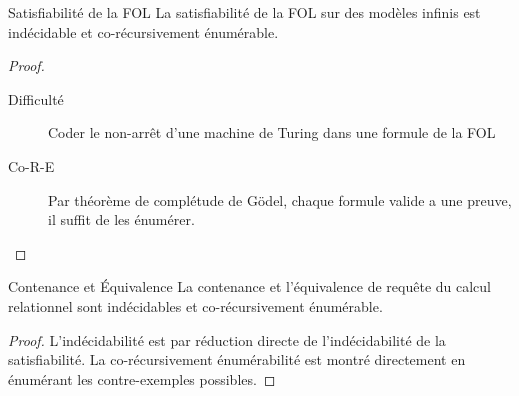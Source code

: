 \documentclass{cours}
\begin{document}
\begin{théorème}{Satisfiabilité de la FOL}{}
    La satisfiabilité de la FOL sur des modèles infinis est indécidable et co-récursivement énumérable. 
\end{théorème}
\begin{proof}
    \begin{description}
        \item[Difficulté] Coder le non-arrêt d'une machine de Turing dans une formule de la FOL
        \item[Co-R-E] Par théorème de complétude de Gödel, chaque formule valide a une preuve, il suffit de les énumérer.  
    \end{description}
\end{proof}

\begin{théorème}{Contenance et Équivalence}{}
    La contenance et l'équivalence de requête du calcul relationnel sont indécidables et co-récursivement énumérable. 
\end{théorème}
\begin{proof}
    L'indécidabilité est par réduction directe de l'indécidabilité de la satisfiabilité. La co-récursivement énumérabilité est montré directement en énumérant les contre-exemples possibles. 
\end{proof}
\end{document}
